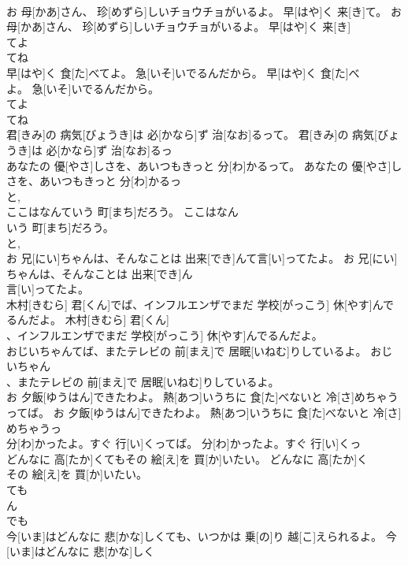 \documentclass[8pt]{extreport}
\begin{document}
\begin{CJK}{UTF8}{min}
\\	お 母[かあ]さん、 珍[めずら]しいチョウチョがいるよ。 早[はや]く 来[き]て。	お 母[かあ]さん、 珍[めずら]しいチョウチョがいるよ。 早[はや]く 来[き]
\\	てよ 
\\	てね 
\\	早[はや]く 食[た]べてよ。 急[いそ]いでるんだから。	早[はや]く 食[た]べ
\\	よ。 急[いそ]いでるんだから。	
\\	てよ 
\\	てね 
\\	君[きみ]の 病気[びょうき]は 必[かなら]ず 治[なお]るって。	君[きみ]の 病気[びょうき]は 必[かなら]ず 治[なお]るっ
\\	あなたの 優[やさ]しさを、あいつもきっと 分[わ]かるって。	あなたの 優[やさ]しさを、あいつもきっと 分[わ]かるっ
\\	と, 
\\	ここはなんていう 町[まち]だろう。	ここはなん
\\	いう 町[まち]だろう。	
\\	と, 
\\	お 兄[にい]ちゃんは、そんなことは 出来[でき]んて言[い]ってたよ。	お 兄[にい]ちゃんは、そんなことは 出来[でき]ん
\\	言[い]ってたよ。	
\\	木村[きむら] 君[くん]でば、インフルエンザでまだ 学校[がっこう] 休[やす]んでるんだよ。	木村[きむら] 君[くん]
\\	、インフルエンザでまだ 学校[がっこう] 休[やす]んでるんだよ。	
\\	おじいちゃんてば、またテレビの 前[まえ]で 居眠[いねむ]りしているよ。	おじいちゃん
\\	、またテレビの 前[まえ]で 居眠[いねむ]りしているよ。	
\\	お 夕飯[ゆうはん]できたわよ。 熱[あつ]いうちに 食[た]べないと 冷[さ]めちゃうってば。	お 夕飯[ゆうはん]できたわよ。 熱[あつ]いうちに 食[た]べないと 冷[さ]めちゃうっ
\\	分[わ]かったよ。すぐ 行[い]くってば。	分[わ]かったよ。すぐ 行[い]くっ
\\	どんなに 高[たか]くてもその 絵[え]を 買[か]いたい。	どんなに 高[たか]く
\\	その 絵[え]を 買[か]いたい。	
\\	ても 
\\	ん 
\\	でも 
\\	今[いま]はどんなに 悲[かな]しくても、いつかは 乗[の]り 越[こ]えられるよ。	今[いま]はどんなに 悲[かな]しく

\end{CJK}
\end{document}
